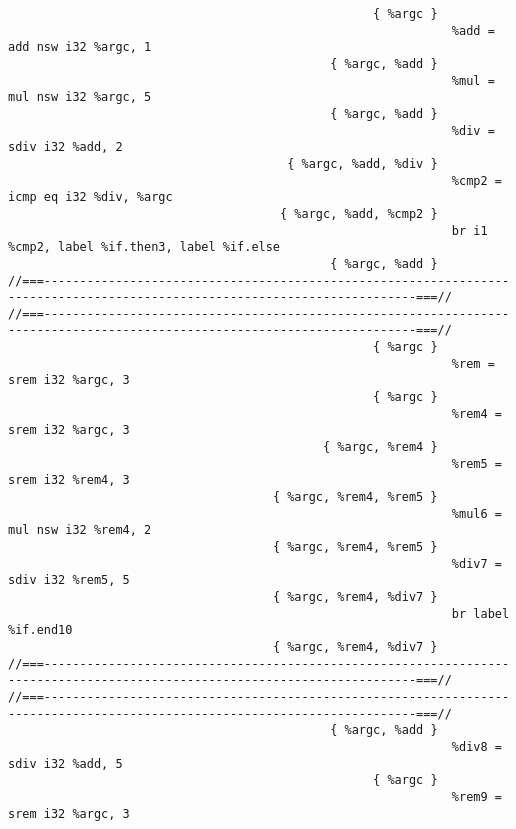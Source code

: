 \begin{verbatim}
                                                   { %argc }
                                                              %add = add nsw i32 %argc, 1
                                             { %argc, %add }
                                                              %mul = mul nsw i32 %argc, 5
                                             { %argc, %add }
                                                              %div = sdiv i32 %add, 2
                                       { %argc, %add, %div }
                                                              %cmp2 = icmp eq i32 %div, %argc
                                      { %argc, %add, %cmp2 }
                                                              br i1 %cmp2, label %if.then3, label %if.else
                                             { %argc, %add }
//===--------------------------------------------------------------------------------------------------------------------------===//
//===--------------------------------------------------------------------------------------------------------------------------===//
                                                   { %argc }
                                                              %rem = srem i32 %argc, 3
                                                   { %argc }
                                                              %rem4 = srem i32 %argc, 3
                                            { %argc, %rem4 }
                                                              %rem5 = srem i32 %rem4, 3
                                     { %argc, %rem4, %rem5 }
                                                              %mul6 = mul nsw i32 %rem4, 2
                                     { %argc, %rem4, %rem5 }
                                                              %div7 = sdiv i32 %rem5, 5
                                     { %argc, %rem4, %div7 }
                                                              br label %if.end10
                                     { %argc, %rem4, %div7 }
//===--------------------------------------------------------------------------------------------------------------------------===//
//===--------------------------------------------------------------------------------------------------------------------------===//
                                             { %argc, %add }
                                                              %div8 = sdiv i32 %add, 5
                                                   { %argc }
                                                              %rem9 = srem i32 %argc, 3

\end{verbatim}
